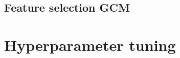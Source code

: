 \documentclass[a4paper,11pt,oneside]{report}
\begin{document}
\section{Feature selection GCM}

\chapter{Hyperparameter tuning}


%
\end{document}
